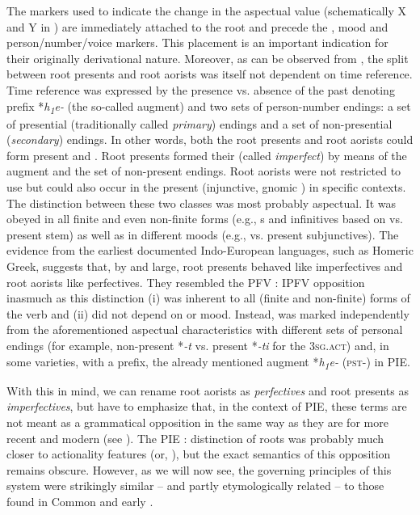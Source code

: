 \documentclass[output=paper]{langsci/langscibook}
\begin{document}
The markers used to indicate the change in the aspectual value (schematically X and Y in ) are immediately attached to the root and precede the , mood and person/number/voice markers. This placement is an important indication for their originally derivational nature. Moreover, as can be observed from , the split between root presents and root aorists was itself not dependent on time reference. Time reference was expressed by the presence vs. absence of the past denoting prefix *\textit{h\textsubscript{1}e-} (the so-called augment) and two sets of person-number endings: a set of presential (traditionally called \textit{primary}) endings and a set of non-presential (\textit{secondary}) endings. In other words, both the root presents and root aorists could form present and . Root presents formed their  (called \textit{imperfect}) by means of the augment and the set of non-present endings. Root aorists were not restricted to  use but could also occur in the present  (injunctive, gnomic ) in specific contexts. The distinction between these two classes was most probably aspectual. It was obeyed in all finite and even non-finite forms (e.g., s and infinitives based on  vs. present stem) as well as in different moods (e.g.,  vs. present subjunctives). The evidence from the earliest documented Indo-European languages, such as Homeric Greek, suggests that, by and large, root presents behaved like imperfectives and root aorists like perfectives. They resembled the  PFV : IPFV opposition inasmuch as this distinction (i) was inherent to all (finite and non-finite) forms of the verb and (ii) did not depend on  or mood. Instead,  was marked independently from the aforementioned aspectual characteristics with different sets of personal endings (for example, non-present *\textit{-t} vs. present *\textit{-ti} for the \textsc{3sg.act}) and, in some varieties, with a prefix, the already mentioned augment *\textit{h\textsubscript{1}e-} (\textsc{pst-}) in PIE.

With this in mind, we can rename root aorists as \textit{perfectives} and root presents as \textit{imperfectives}, but have to emphasize that, in the context of PIE, these terms are not meant as a grammatical opposition in the same way as they are for more recent and modern  (see ). The PIE  :  distinction of roots was probably much closer to actionality features (or, ), but the exact semantics of this opposition remains obscure. However, as we will now see, the governing principles of this system were strikingly similar – and partly etymologically related – to those found in Common and early . 
\end{document}

